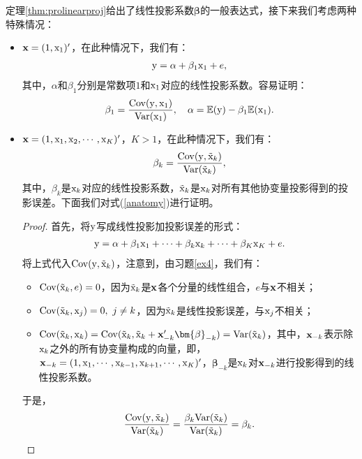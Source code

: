 \documentclass[cn,11pt,chinese]{elegantbook}
\begin{document}
定理\ref{thm:prolinearproj}给出了线性投影系数$\bm{\beta}$的一般表达式，接下来我们考虑两种特殊情况：
\begin{itemize}
	\item $\bold{x}=(1,\rm{x}_{1})'$，在此种情况下，我们有：
	\begin{eqnarray*}
		{\rm{y}} = \alpha + \beta_{1}{\rm{x}}_{1} + e,
	\end{eqnarray*}
	其中，$\alpha$和$\beta_{1}$分别是常数项$1$和$\rm{x}_{1}$对应的线性投影系数。容易证明：
	\begin{eqnarray}\label{binary}
		\beta_{1}=\dfrac{{\rm{Cov}}({\rm{y}},\rm{x}_{1})}{{\rm{Var}}(\rm{x}_{1})},\quad \alpha=\mathbb{E}({\rm{y}})-\beta_{1}\mathbb{E}(\rm{x}_{1}).
	\end{eqnarray}
	\item ${\bold{x}}=(1,{\rm{x}}_{1},{\rm{x}}_{2},\cdots,{\rm{x}}_{K})'$，$K>1$，在此种情况下，我们有：
	\begin{eqnarray}\label{anatomy}
			\beta_{k} = \frac{{\rm{Cov}}({\rm{y}},\tilde{\rm{x}}_{k})}{{\rm{Var}}(\tilde{\rm{x}}_{k})},
	\end{eqnarray}
	其中，$\beta_{k}$是${\rm{x}}_{k}$对应的线性投影系数，$\tilde{\rm{x}}_{k}$是${\rm{x}}_{k}$对所有其他协变量投影得到的投影误差。下面我们对式(\ref{anatomy})进行证明。
	\begin{proof}
	首先，将$\rm{y}$写成线性投影加投影误差的形式：
		\begin{eqnarray*}
		{\rm{y}} = \alpha+\beta_{1}{\rm{x}}_{1}+\cdots+\beta_{k}{\rm{x}}_{k}+\cdots+\beta_{K}{\rm{x}}_{K}+e.
	    \end{eqnarray*}
	    将上式代入${\rm{Cov}}({\rm{y}},\tilde{{\rm{x}}}_{k})$，注意到，由习题\ref{ex4}，我们有：
	    \begin{itemize}
		\item ${\rm{Cov}}(\tilde{{\rm{x}}}_{k},e)=0$，因为$\tilde{{\rm{x}}}_{k}$是$\bold{x}$各个分量的线性组合，$e$与$\bold{x}$不相关；
		\item ${\rm{Cov}}(\tilde{{\rm{x}}}_{k},{\rm{x}}_{j})=0,~j\neq k$，因为$\tilde{{\rm{x}}}_{k}$是线性投影误差，与${\rm{x}}_{j}$不相关；
		\item ${\rm{Cov}}(\tilde{{\rm{x}}}_{k},{\rm{x}}_{k})={\rm{Cov}}(\tilde{{\rm{x}}}_{k},\tilde{{\rm{x}}}_{k}+\bold{x}_{-k}'\bm{\beta}_{-k})={\rm{Var}}(\tilde{{\rm{x}}}_{k})$，其中，$\bold{x}_{-k}$表示除${\rm{x}}_{k}$之外的所有协变量构成的向量，即，$\bold{x}_{-k}=(1,{\rm{x}}_{1},\cdots,{\rm{x}}_{k-1},{\rm{x}}_{k+1},\cdots,{\rm{x}}_{K})'$，$\bm{\beta}_{-k}$是${\rm{x}}_{k}$对$\bold{x}_{-k}$进行投影得到的线性投影系数。
	    \end{itemize}
	    于是，
	\begin{eqnarray*}
		\frac{{\rm{Cov}}({\rm{y}},\tilde{{\rm{x}}}_{k})}{{\rm{Var}}(\tilde{{\rm{x}}}_{k})}=\frac{\beta_{k}{\rm{Var}}(\tilde{{\rm{x}}}_{k})}{{\rm{Var}}(\tilde{{\rm{x}}}_{k})}=\beta_{k}.
	\end{eqnarray*}
	\end{proof}
\end{itemize}
\end{document}
